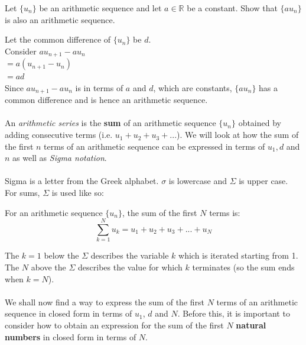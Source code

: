\documentclass[12pt, a4paper, titlepage, twoside]{article}
\newcommand*{\R}{\mathbb{R}}
\newcounter{excount}[subsection]
\begin{document}
	\hfill
	
	\begin{ex}
		Let $\{u_n\}$ be an arithmetic sequence and let $a \in \R$ be a constant. Show that $\{au_n\}$ is also an arithmetic
		sequence.
		
		\tcbline
		\hfill
		
		Let the common difference of $\{u_n\}$ be $d$.\\
		
		Consider $au_{n+1} - au_n$\\
		$= a(u_{n+1} - u_n)$ \\
		$= ad$\\
		
		Since $au_{n+1} - au_{n}$ is in terms of $a$ and $d$, which are constants, $\{au_n\}$ has a common
		difference and is hence an arithmetic sequence.
	\end{ex}
	
	\paragraph{}
	An \textit{arithmetic series} is the \textbf{sum} of an arithmetic sequence $\{u_n\}$ obtained by adding consecutive
	terms (i.e. $u_1 + u_2 + u_3 + ...$). We will look at how the sum of the first $n$ terms of an arithmetic sequence can be
	expressed in terms of $u_1, d$ and  $n$ as well as \textit{Sigma notation}.
	
	\paragraph{}
	Sigma is a letter from the Greek alphabet. $\sigma$ is lowercase and $\Sigma$ is upper case. For sums, $\Sigma$ is used like
	so:\\
	
	\begin{kp}
		For an arithmetic sequence $\{u_n\}$, the sum of the first $N$ terms is:
		$$\sum_{k=1}^N u_k = u_1 + u_2 + u_3 + ... + u_N$$
	\end{kp} 
	
	The $k=1$ below the $\Sigma$ describes the variable $k$ which is iterated starting from 1. The $N$ above the $\Sigma$ describes
	the value for which $k$ terminates (so the sum ends when $k=N$).
	
	\paragraph{}
	We shall now find a way to express the sum of the first $N$ terms of an arithmetic sequence in closed form in terms of $u_1$, $d$ and
	$N$. Before this, it is important to consider how to obtain an expression for the sum of the first $N$ \textbf{natural numbers} in closed
	form in terms of $N$.\\
	
\end{document}
